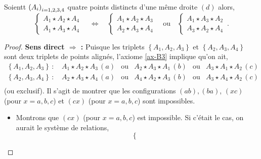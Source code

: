 \begin{cor}\label{cor-configurationdespointsinterne}
    Soientt $\left(A_{i}\right)_{i = 1,2,3,4}$ quatre points distincts d'une même droite $(d)$ alors,
    \begin{equation*}
        \left\{
        \begin{array}{cc}
             A_1 \star A_2 \star A_4  \\
             A_1 \star A_3 \star A_4 
        \end{array}
        \right. \quad \Longleftrightarrow \quad       
        \left\{\begin{array}{cc}
             A_1 \star A_2 \star A_3  \\
             A_2 \star A_3 \star A_4 
        \end{array}\right. \quad \text{ou} \quad
        \left\{\begin{array}{cc}
             A_1 \star A_3 \star A_2  \\
             A_3 \star A_2 \star A_4
        \end{array}\right.\,.
    \end{equation*}
    \begin{proof}
        \textbf{Sens direct $\Rightarrow$ : } Puisque les triplets $\left\{A_1,A_2,A_3\right\}$ et $\left\{A_2,A_3,A_4\right\}$ sont deux triplets de points alignés, l'axiome \ref{ax-B3} implique qu'on ait,
        \begin{equation*}
            \begin{array}{cccccc}
                 \left\{A_1,A_2,A_3\right\}\,:\,& A_1 \star A_2 \star A_3 \,(a) & \text{ou} & A_2 \star A_3 \star A_1 \,(b) & \text{ou} & A_3 \star A_1 \star A_2 \,(c) \\
                 \left\{A_2,A_3,A_4\right\}\,:\,& A_2 \star A_3 \star A_4 \,(a) & \text{ou} & A_4 \star A_2 \star A_3 \,(b) & \text{ou} & A_3 \star A_4 \star A_2 \,(c) \\
            \end{array}
        \end{equation*}
        (ou exclusif). Il s'agit de montrer que les configurations $(ab),(ba)$, $(xc)$ (pour $x=a,b,c$) et $(cx)$ (pour $x=a,b,c$) sont impossibles.
        \begin{itemize}[$\bullet$]
            \item Montrons que $(cx)$ (pour $x=a,b,c$) est impossible. Si c'était le cas, on aurait le système de relations,
            \begin{equation*}
                \left\{\begin{array}{cc}

\end{array}
\end{equation*}
\end{itemize}
\end{proof}
\end{cor}

